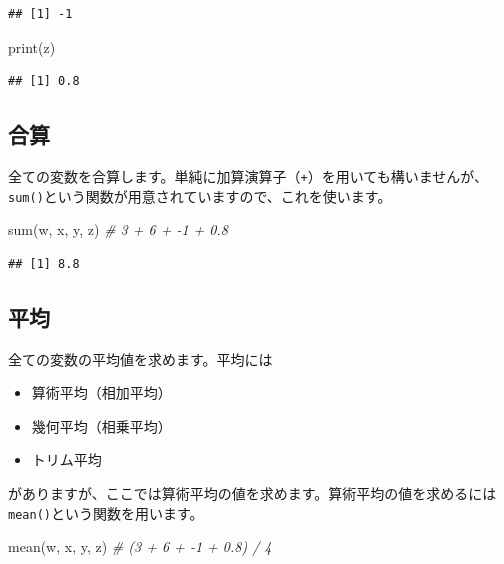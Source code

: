 \documentclass[
  12pt,
]{book}
\newenvironment{Shaded}{\begin{snugshade}}{\end{snugshade}}
\newcommand{\CommentTok}[1]{\textcolor[rgb]{0.56,0.35,0.01}{\textit{#1}}}
\newcommand{\FunctionTok}[1]{\textcolor[rgb]{0.00,0.00,0.00}{#1}}
\newcommand{\NormalTok}[1]{#1}
\providecommand{\tightlist}{%
  \setlength{\itemsep}{0pt}\setlength{\parskip}{0pt}}
\begin{document}
\begin{verbatim}
## [1] -1
\end{verbatim}

\begin{Shaded}
\begin{Highlighting}[numbers=left,,]
\FunctionTok{print}\NormalTok{(z)}
\end{Highlighting}
\end{Shaded}

\begin{verbatim}
## [1] 0.8
\end{verbatim}

\hypertarget{ux5408ux7b97}{%
\subsection{合算}\label{ux5408ux7b97}}

全ての変数を合算します。単純に加算演算子（\texttt{+}）を用いても構いませんが、\texttt{sum()}という関数が用意されていますので、これを使います。

\begin{Shaded}
\begin{Highlighting}[numbers=left,,]
\FunctionTok{sum}\NormalTok{(w, x, y, z)    }\CommentTok{\# 3 + 6 + {-}1 + 0.8}
\end{Highlighting}
\end{Shaded}

\begin{verbatim}
## [1] 8.8
\end{verbatim}

\hypertarget{ux5e73ux5747-1}{%
\subsection{平均}\label{ux5e73ux5747-1}}

全ての変数の平均値を求めます。平均には

\begin{itemize}
\tightlist
\item
  算術平均（相加平均）
\item
  幾何平均（相乗平均）
\item
  トリム平均
\end{itemize}

がありますが、ここでは算術平均の値を求めます。算術平均の値を求めるには\texttt{mean()}という関数を用います。

\begin{Shaded}
\begin{Highlighting}[numbers=left,,]
\FunctionTok{mean}\NormalTok{(w, x, y, z)   }\CommentTok{\# (3 + 6 + {-}1 + 0.8) / 4}
\end{Highlighting}
\end{Shaded}
\end{document}
